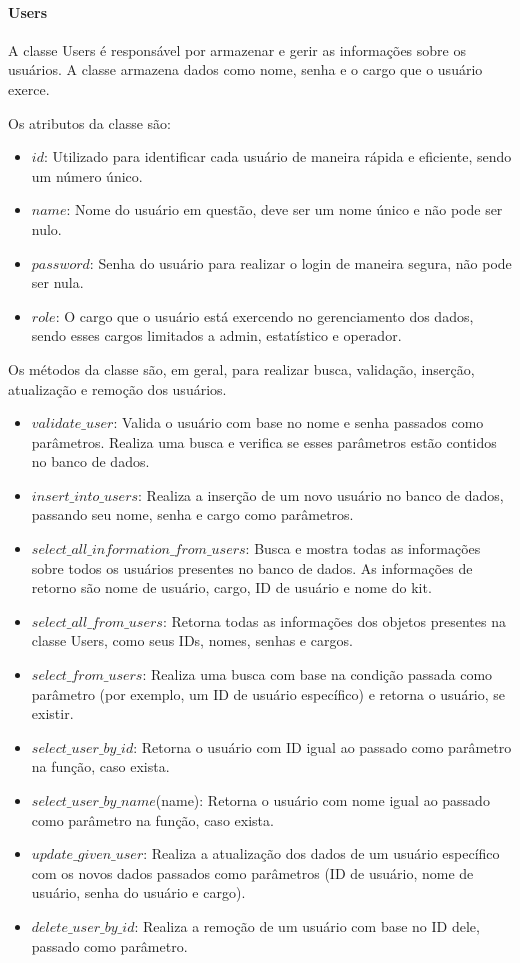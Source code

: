 \documentclass[conference, a4paper, 12pt]{IEEEtran}
\begin{document}
\paragraph{Users}
A classe Users é responsável por armazenar e gerir as informações sobre os usuários. A classe armazena dados como nome, senha e o cargo que o usuário exerce.

Os atributos da classe são:
\begin{itemize}
  \item $id$: Utilizado para identificar cada usuário de maneira rápida e eficiente, sendo um número único.
  \item $name$: Nome do usuário em questão, deve ser um nome único e não pode ser nulo.
  \item $password$: Senha do usuário para realizar o login de maneira segura, não pode ser nula.
  \item $role$: O cargo que o usuário está exercendo no gerenciamento dos dados, sendo esses cargos limitados a admin, estatístico e operador.
\end{itemize}

Os métodos da classe são, em geral, para realizar busca, validação, inserção, atualização e remoção dos usuários.

\begin{itemize}
  \item $validate\_user$: Valida o usuário com base no nome e senha passados como parâmetros. Realiza uma busca e verifica se esses parâmetros estão contidos no banco de dados.
    \item $insert\_into\_users$: Realiza a inserção de um novo usuário no banco de dados, passando seu nome, senha e cargo como parâmetros.
    \item $select\_all\_information\_from\_users$: Busca e mostra todas as informações sobre todos os usuários presentes no banco de dados. As informações de retorno são nome de usuário, cargo, ID de usuário e nome do kit.
    \item $select\_all\_from\_users$: Retorna todas as informações dos objetos presentes na classe Users, como seus IDs, nomes, senhas e cargos.
    \item $select\_from\_users$: Realiza uma busca com base na condição passada como parâmetro (por exemplo, um ID de usuário específico) e retorna o usuário, se existir.
    \item $select\_user\_by\_id$: Retorna o usuário com ID igual ao passado como parâmetro na função, caso exista.
      \item $select\_user\_by\_name$(name): Retorna o usuário com nome igual ao passado como parâmetro na função, caso exista.
      \item $update\_given\_user$: Realiza a atualização dos dados de um usuário específico com os novos dados passados como parâmetros (ID de usuário, nome de usuário, senha do usuário e cargo).
      \item $delete\_user\_by\_id$: Realiza a remoção de um usuário com base no ID dele, passado como parâmetro.
\end{itemize}
\end{document}
